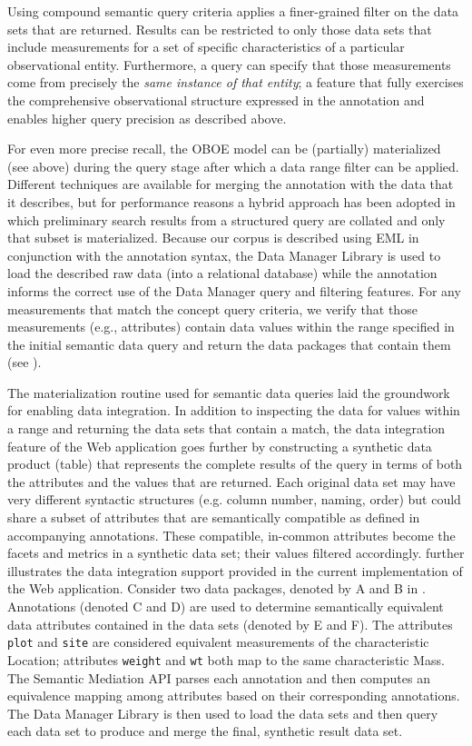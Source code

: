 Using compound semantic query criteria applies a finer-grained filter
on the data sets that are returned. Results can be restricted to only
those data sets that include measurements for a set of specific
characteristics of a particular observational entity. Furthermore, a
query can specify that those measurements come from precisely the
\emph{same instance of that entity}; a feature that fully exercises
the comprehensive observational structure expressed in the annotation
and enables higher query precision as described above.

 For even more precise recall, the OBOE
model can be (partially) materialized (see above) during the query
stage after which a data range filter can be applied. Different
techniques are available for merging the annotation with the data that
it describes, but for performance reasons a hybrid approach has been
adopted in which preliminary search results from a structured query
are collated and only that subset is materialized. Because our corpus
is described using EML in conjunction with the annotation syntax, the
Data Manager Library \cite{leinfelder10} is used to load the described
raw data (into a relational database) while the annotation informs the
correct use of the Data Manager query and filtering features. For any
measurements that match the concept query criteria, we verify that
those measurements (e.g., attributes) contain data values within the
range specified in the initial semantic data query and return the data
packages that contain them (see ). 

 The materialization routine used for
semantic data queries laid the groundwork for enabling data
integration. In addition to inspecting the data for values within a
range and returning the data sets that contain a match, the data
integration feature of the Web application goes further by
constructing a synthetic data product (table) that represents the
complete results of the query in terms of both the attributes and the
values that are returned. Each original data set may have very
different syntactic structures (e.g. column number, naming, order) but
could share a subset of attributes that are semantically compatible as
defined in accompanying annotations. These compatible, in-common
attributes become the facets and metrics in a synthetic data set; their
values filtered accordingly.  further
illustrates the data integration support provided in the current
implementation of the Web application. Consider two data packages,
denoted by A and B in .  Annotations (denoted
C and D) are used to determine semantically equivalent data attributes
contained in the data sets (denoted by E and F). The attributes {\tt
  plot} and {\tt site} are considered equivalent measurements of the
characteristic Location; attributes {\tt weight} and {\tt wt} both map
to the same characteristic Mass. The Semantic Mediation API parses
each annotation and then computes an equivalence mapping among
attributes based on their corresponding annotations. The Data Manager
Library is then used to load the data sets and then query each data
set to produce and merge the final, synthetic result data set. 

